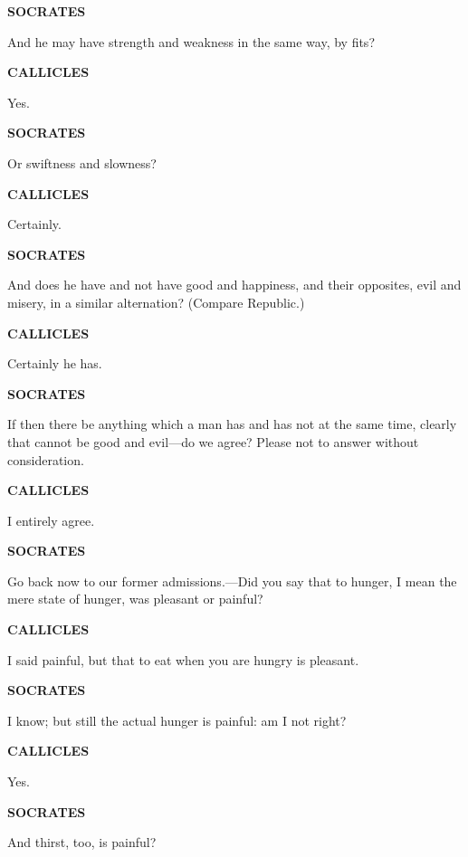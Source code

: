 \documentclass[11pt,letter]{article}
\begin{document}
\par \textbf{SOCRATES}
\par   And he may have strength and weakness in the same way, by fits?

\par \textbf{CALLICLES}
\par   Yes.

\par \textbf{SOCRATES}
\par   Or swiftness and slowness?

\par \textbf{CALLICLES}
\par   Certainly.

\par \textbf{SOCRATES}
\par   And does he have and not have good and happiness, and their opposites, evil and misery, in a similar alternation? (Compare Republic.)

\par \textbf{CALLICLES}
\par   Certainly he has.

\par \textbf{SOCRATES}
\par   If then there be anything which a man has and has not at the same time, clearly that cannot be good and evil—do we agree? Please not to answer without consideration.

\par \textbf{CALLICLES}
\par   I entirely agree.

\par \textbf{SOCRATES}
\par   Go back now to our former admissions.—Did you say that to hunger, I mean the mere state of hunger, was pleasant or painful?

\par \textbf{CALLICLES}
\par   I said painful, but that to eat when you are hungry is pleasant.

\par \textbf{SOCRATES}
\par   I know; but still the actual hunger is painful:  am I not right?

\par \textbf{CALLICLES}
\par   Yes.

\par \textbf{SOCRATES}
\par   And thirst, too, is painful?
\end{document}
